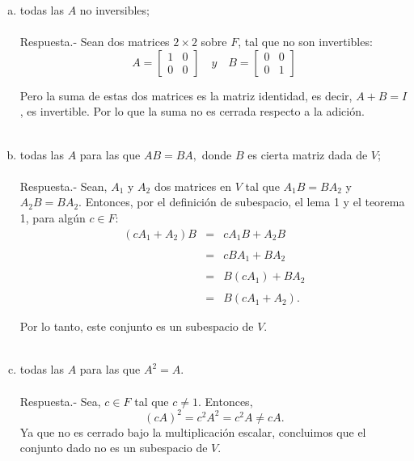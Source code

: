 \begin{enumerate}[\bfseries 1.]
\begin{enumerate}[(a)]
	    \item todas las $A$ no inversibles;\\\\
		Respuesta.-\; Sean dos matrices $2\times 2$ sobre $F$, tal que no son invertibles:
		$$
		A=
		\left[
		    \begin{array}{rr}
			1 & 0\\
			0 & 0
		    \end{array}
		\right]
		\quad y \quad B=
		\left[
		    \begin{array}{rr}
			0 & 0\\
			0 & 1
		    \end{array}
		\right]
		$$

		Pero la suma de estas dos matrices es la matriz identidad, es decir, $A+B=I$, es invertible. Por lo que la suma no es cerrada respecto a la adición.\\\\


	    \item todas las $A$ para las que $AB=BA,$ donde $B$ es cierta matriz dada de $V$;\\\\
		Respuesta.-\; Sean, $A_1$ y $A_2$ dos matrices en $V$ tal que $A_1B=BA_2$ y $A_2B=BA_2$. Entonces, por el definición de subespacio, el lema 1 y el teorema 1, para algún $c\in F$:
		$$
		\begin{array}{rcl}
		    (cA_1+A_2)B &=& cA_1B+A_2B\\\\
				&=& cBA_1+BA_2\\\\
				&=& B(cA_1)+BA_2\\\\
				&=& B(cA_1+A_2).
		\end{array}
		$$

		Por lo tanto, este conjunto es un subespacio de $V$.\\\\

	    \item todas las $A$ para las que $A^2=A$.\\\\
		Respuesta.-\; Sea, $c\in F$ tal que $c\neq 1$. Entonces,
		$$(cA)^2=c^2A^2=c^2A\neq cA.$$
		Ya que no es cerrado bajo la multiplicación escalar, concluimos que el conjunto dado no es un subespacio de $V$.\\\\


\end{enumerate}
\end{enumerate}
